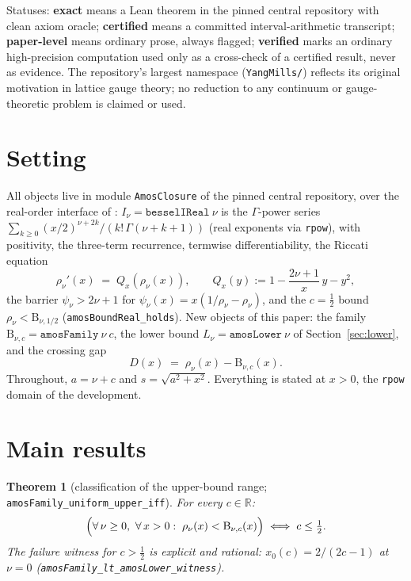 \documentclass[11pt]{article}
\newtheorem{theorem}{Theorem}[section]
\newcommand{\lean}[1]{\texttt{#1}}
\newcommand{\Bfam}{\mathrm{B}}
\begin{document}
Statuses: \textbf{exact} means a Lean theorem in the pinned central
repository with clean axiom oracle; \textbf{certified} means a
committed interval-arithmetic transcript; \textbf{paper-level}
means ordinary prose, always flagged; \textbf{verified} marks an
ordinary high-precision computation used only as a cross-check of a
certified result, never as evidence.  The repository's largest
namespace (\lean{YangMills/}) reflects its original motivation in
lattice gauge theory; no reduction to any continuum or
gauge-theoretic problem is claimed or used.

\section{Setting}\label{sec:setting}

All objects live in module \lean{AmosClosure} of the pinned central
repository, over the real-order interface of \cite{ErikssonC4}:
$I_\nu = \lean{besselIReal}\ \nu$ is the $\Gamma$-power series
$\sum_{k\ge0}(x/2)^{\nu+2k}/(k!\,\Gamma(\nu+k+1))$ (real exponents
via \lean{rpow}), with positivity, the three-term recurrence,
termwise differentiability, the Riccati equation
\begin{equation}\label{eq:riccati}
\rho_\nu'(x) \;=\; Q_x(\rho_\nu(x)), \qquad
Q_x(y) := 1 - \frac{2\nu+1}{x}\,y - y^2,
\end{equation}
the barrier $\psi_\nu > 2\nu+1$ for
$\psi_\nu(x) = x(1/\rho_\nu - \rho_\nu)$, and the $c=\tfrac12$
bound $\rho_\nu < \Bfam_{\nu,1/2}$ (\lean{amosBoundReal\_holds}).
New objects of this paper: the family
$\Bfam_{\nu,c} = \lean{amosFamily}\ \nu\ c$, the lower bound
$L_\nu = \lean{amosLower}\ \nu$ of Section~\ref{sec:lower}, and the
crossing gap
\[
D(x) \;=\; \rho_\nu(x) - \Bfam_{\nu,c}(x).
\]
Throughout, $a = \nu+c$ and $s = \sqrt{a^2+x^2}$.  Everything is
stated at $x > 0$, the \lean{rpow} domain of the development.

\section{Main results}\label{sec:results}

\begin{theorem}[classification of the upper-bound range;
\lean{amosFamily\_uniform\_upper\_iff}]\label{thm:classification}
For every $c \in \mathbb{R}$:
\[
\Bigl(\forall\, \nu \ge 0,\ \forall\, x > 0:\;
\rho_\nu(x) < \Bfam_{\nu,c}(x)\Bigr)
\;\Longleftrightarrow\;
c \le \tfrac12 .
\]
The failure witness for $c > \tfrac12$ is explicit and rational:
$x_0(c) = 2/(2c-1)$ at $\nu = 0$
(\lean{amosFamily\_lt\_amosLower\_witness}).
\end{theorem}
\end{document}
